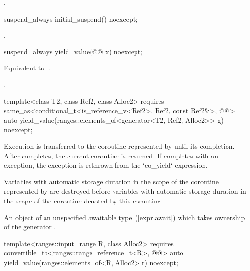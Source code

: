 \documentclass{wg21}
\begin{document}
\begin{addedblock}
\begin{itemdescr}
\returns
{}.
\end{itemdescr}

\begin{itemdecl}
suspend_always initial_suspend() noexcept;
\end{itemdecl}

\begin{itemdescr}
\returns \tcode{\{\}}.
\end{itemdescr}

\begin{itemdecl}
suspend_always yield_value(@@ x) noexcept;
\end{itemdecl}

\begin{itemdescr}
\effects
Equivalent to:
.

\returns
\tcode{\{\}}.
\end{itemdescr}

\begin{itemdecl}
template<class T2, class Ref2, class Alloc2>
  requires same_as<conditional_t<is_reference_v<Ref2>, Ref2, const Ref2&>, @@>
    auto yield_value(ranges::elements_of<generator<T2, Ref2, Alloc2>> g) noexcept;
\end{itemdecl}

\begin{itemdescr}
\effects
Execution is transferred to the coroutine represented by  until its completion.
After  completes, the current coroutine is resumed.
If  completes with an exception, the exception is rethrown from the `co_yield` expression.

Variables with automatic storage duration in the scope of the coroutine represented by  are destroyed
before variables with automatic storage duration in the scope of the coroutine denoted by this coroutine.

\returns
An object of an unspecified awaitable type~([expr.await])
which takes ownership of the generator .
\end{itemdescr}


\begin{itemdecl}
template<ranges::input_range R, class Alloc2>
  requires convertible_to<ranges::range_reference_t<R>, @@>
    auto yield_value(ranges::elements_of<R, Alloc2> r) noexcept;
\end{itemdecl}


\end{addedblock}
\end{document}
